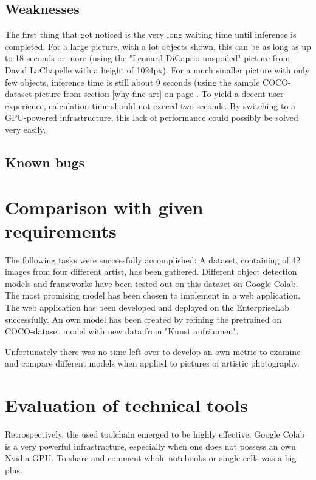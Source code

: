 \subsection{Weaknesses}

The first thing that got noticed is the very long waiting time until inference is completed. For a large picture, with a lot objects shown, this can be as long as up to 18 seconds or more (using the "Leonard DiCaprio unspoiled" picture from David LaChapelle with a height of 1024px). For a much smaller picture with only few objects, inference time is still about 9 seconds (using the sample COCO-dataset picture from section \ref{why-fine-art} on page \pageref{why-fine-art}. To yield a decent user experience, calculation time should not exceed two seconds. By switching to a GPU-powered infrastructure, this lack of performance could possibly be solved very easily.

\subsection{Known bugs}

\section{Comparison with given requirements}

The following tasks were successfully accomplished: A dataset, containing of 42 images from four different artist, has been gathered. Different object detection models and frameworks have been tested out on this dataset on Google Colab. The most promising model has been chosen to implement in a web application. The web application has been developed and deployed on the EnterpriseLab successfully. An own model has been created by refining the pretrained on COCO-dataset model with new data from "Kunst aufräumen".

Unfortunately there was no time left over to develop an own metric to examine and compare different models when applied to pictures of artistic photography.

\section{Evaluation of technical tools}

Retrospectively, the used toolchain emerged to be highly effective. Google Colab is a very powerful infrastracture, especially when one does not possess an own Nvidia GPU. To share and comment whole notebooks or single cells was a big plus.

